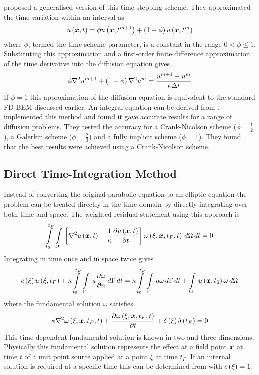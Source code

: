  proposed a generalised version of this time-stepping
scheme.  They approximated the time variation within an interval as
\begin{equation}
\fnof{u}{\vect{x},t} = \phi \fnof{u}{\vect{x},t^{m+1}} + \pbrac{1-\phi}
\fnof{u}{\vect{x},t^{m}}
\end{equation}
where $\phi$, termed the time-scheme parameter, is a constant in the range
$0 < \phi \leq 1$.  Substituting this approximation and a first-order
finite difference approximation of the time derivative into the diffusion
equation gives
\begin{equation}
  \phi \nabla^{2} {u^{m+1}} + \left( 1 - \phi \right) \nabla^{2} {u^{m}} = \dfrac{u^{m+1} -
    u^{m}}{\kappa \Delta t}
\label{eq:tandiffapprox}
\end{equation}
If $\phi = 1$ this approximation of the diffusion equation is
equivalent to the standard FD-BEM discussed earlier.  An integral equation
can be derived from .  
implemented this method and found it gave accurate results for a range of
diffusion problems.  They tested the accuracy for a Crank-Nicolson scheme
($\phi = \frac{1}{2}$), a Galerkin scheme ($\phi = \frac{2}{3}$) and a
fully implicit scheme ($\phi = 1$). They found that the best results were
achieved using a Crank-Nicolson scheme. 

\subsection{Direct Time-Integration Method}

Instead of converting the original parabolic equation to an elliptic
equation the problem can be treated directly in the time domain by directly
integrating over both time and space.  The weighted residual statement
using this approach is
\begin{equation}
  \gint{t_{0}}{t_{F}}{\goneint{\sqbrac{\laplacian{\fnof{u}{\vect{x},t}} -
        \dfrac{1}{\kappa} \delby{\fnof{u}{\vect{x},t}}{t}}
      \fnof{\omega}{\xi,\vect{x},t_{F},t}}{\Omega}}{t} = 0
\end{equation}
Integrating in time once and in space twice gives
\begin{equation}
  \fnof{c}{\xi} \fnof{u}{\xi,t_{F}} + \kappa \gint{t_{0}}{t_{F}}
  {\goneint{u \delby{\omega}{n}}{\Gamma}}{t} = \kappa
  \gint{t_{0}}{t_{F}}{\goneint{q \omega}{\Gamma}}{t} +
  \goneint{\fnof{u}{\vect{x},t_{0}} \omega}{\Omega}
\label{eq:tdfs}
\end{equation}
where the fundamental solution $\omega$ satisfies
\begin{equation}
  \kappa \laplacian{\fnof{\omega}{\xi,\vect{x},t_{F},t}} 
  + \delby{\fnof{\omega}{\xi,\vect{x},t_{F},t}}{t} 
  + \fnof{\delta}{\xi} \fnof{\delta}{t_{F}} = 0
\end{equation}
This time dependent fundamental solution is known in two and three
dimensions.  Physically this fundamental solution represents the effect at
a field point $\vect{x}$ at time $t$ of a unit point source applied at a
point $\xi$ at time $t_{F}$.  If an internal solution is required at a
specific time this can be determined from  with $ c\left( \xi \right)  = 1$.

